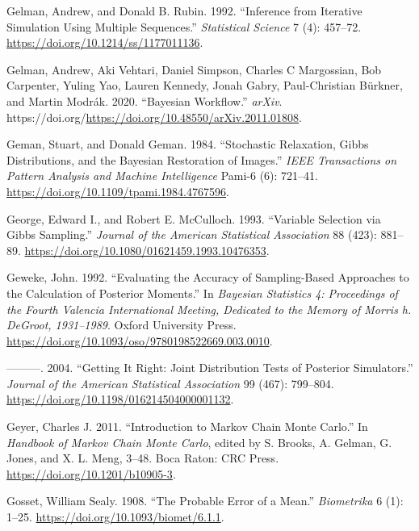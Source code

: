 \documentclass[
  11pt,
  letterpaper,
]{scrbook}
\newlength{\cslhangindent}
\newenvironment{CSLReferences}[2] %
 {\begin{list}{}{%
  \setlength{\itemindent}{0pt}
  \setlength{\leftmargin}{0pt}
  \setlength{\parsep}{0pt}
  \ifodd #1
   \setlength{\leftmargin}{\cslhangindent}
   \setlength{\itemindent}{-1\cslhangindent}
  \fi
  \setlength{\itemsep}{#2\baselineskip}}}
 {\end{list}}
\theoremstyle{plain}
\theoremstyle{plain}
\theoremstyle{definition}
\theoremstyle{definition}
\theoremstyle{definition}
\theoremstyle{plain}
\theoremstyle{remark}
\begin{document}
\begin{CSLReferences}{1}{0}
Gelman, Andrew, and Donald B. Rubin. 1992. {``Inference from Iterative
Simulation Using Multiple Sequences.''} \emph{Statistical Science} 7
(4): 457--72. \url{https://doi.org/10.1214/ss/1177011136}.

Gelman, Andrew, Aki Vehtari, Daniel Simpson, Charles C Margossian, Bob
Carpenter, Yuling Yao, Lauren Kennedy, Jonah Gabry, Paul-Christian
Bürkner, and Martin Modrák. 2020. {``Bayesian Workflow.''} \emph{arXiv}.
https://doi.org/\url{https://doi.org/10.48550/arXiv.2011.01808}.

Geman, Stuart, and Donald Geman. 1984. {``Stochastic Relaxation, {G}ibbs
Distributions, and the {B}ayesian Restoration of Images.''} \emph{IEEE
Transactions on Pattern Analysis and Machine Intelligence} Pami-6 (6):
721--41. \url{https://doi.org/10.1109/tpami.1984.4767596}.

George, Edward I., and Robert E. McCulloch. 1993. {``Variable Selection
via {G}ibbs Sampling.''} \emph{Journal of the American Statistical
Association} 88 (423): 881--89.
\url{https://doi.org/10.1080/01621459.1993.10476353}.

Geweke, John. 1992. {``Evaluating the Accuracy of Sampling-Based
Approaches to the Calculation of Posterior Moments.''} In \emph{Bayesian
Statistics 4: Proceedings of the Fourth Valencia International Meeting,
Dedicated to the Memory of Morris h. DeGroot, 1931--1989}. Oxford
University Press.
\url{https://doi.org/10.1093/oso/9780198522669.003.0010}.

---------. 2004. {``Getting It Right: Joint Distribution Tests of
Posterior Simulators.''} \emph{Journal of the American Statistical
Association} 99 (467): 799--804.
\url{https://doi.org/10.1198/016214504000001132}.

Geyer, Charles J. 2011. {``Introduction to {M}arkov Chain {M}onte
{C}arlo.''} In \emph{Handbook of {M}arkov Chain {M}onte {C}arlo}, edited
by S. Brooks, A. Gelman, G. Jones, and X. L. Meng, 3--48. Boca Raton:
CRC Press. \url{https://doi.org/10.1201/b10905-3}.

Gosset, William Sealy. 1908. {``The Probable Error of a Mean.''}
\emph{Biometrika} 6 (1): 1--25.
\url{https://doi.org/10.1093/biomet/6.1.1}.


\end{CSLReferences}
\end{document}
